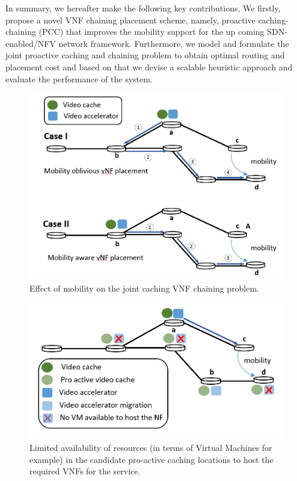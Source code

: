 \documentclass[journal]{IEEEtran}
\begin{document}
In summary, we hereafter make the following key contributions,
We firstly, propose a novel VNF chaining placement scheme, namely, proactive caching-chaining (PCC) that improves the mobility support for the up coming SDN-enabled/NFV network framework.
Furthermore, we model and formulate the joint proactive caching and chaining problem to obtain optimal routing and placement cost and based on that we devise a scalable heuristic approach and evaluate the performance of the system.
\begin{figure}
  \includegraphics[width=0.9\columnwidth]{cache_mobility}
  \caption{Effect of mobility on the joint caching VNF chaining problem.}
  \label{fig:mobility_chain}
\end{figure}
\begin{figure}
  \includegraphics[width=0.9\columnwidth]{no_VM_available}
  \caption{Limited availability of resources (in terms of Virtual Machines for example) in the candidate pro-active caching locations to host the required VNFs for the service.}
  \label{fig:noVM}
\end{figure}
\end{document}
